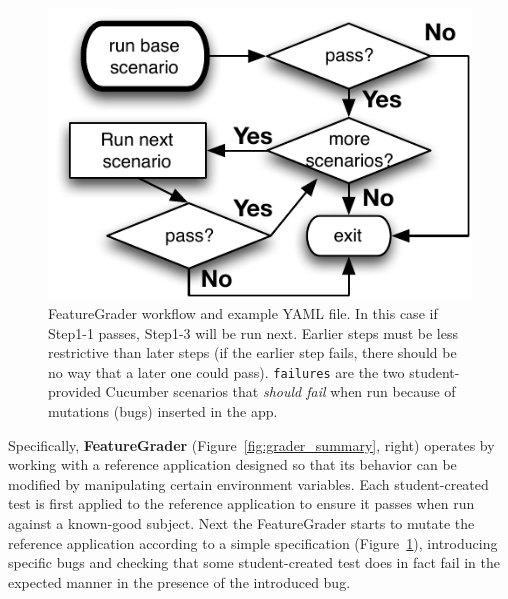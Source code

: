 \begin{figure}
  \begin{minipage}{0.45\textwidth}%
  \includegraphics[width=\textwidth]{figs/feature_grader.pdf}%
  \end{minipage}%
  \begin{minipage}{0.55\textwidth}%
  \end{minipage}
  \caption{\label{fig:featuregrader}%
FeatureGrader workflow and example YAML file.  In this case if Step1-1 passes,
Step1-3 will be run next.  Earlier steps must be less restrictive than
later steps (if the earlier step fails, there should be no way that a later one could pass).
\texttt{failures} are the two student-provided Cucumber scenarios that \emph{should fail} when
run because of mutations (bugs) inserted in the app.
}
\end{figure}


Specifically, \textbf{FeatureGrader}  (Figure~\ref{fig:grader_summary},
right)
operates by working with a
reference application designed so that its behavior can be modified by
manipulating certain environment variables.
Each student-created test   is first applied to the reference
application to ensure it passes when run against a known-good subject.
Next the FeatureGrader starts to mutate the reference application
according to a simple specification (Figure~\ref{fig:featuregrader}), 
introducing specific bugs and checking that some student-created test
does in fact fail in the expected manner in the presence of the
introduced bug.  
